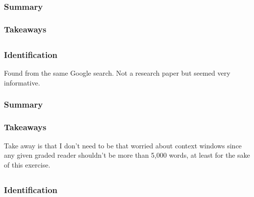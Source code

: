 \documentclass[
	letterpaper, %
]{jdf}
\begin{document}
\subsubsection{Summary}

\subsubsection{Takeaways}

\subsection{}
\subsubsection{Identification}
Found from the same Google search. Not a research paper but seemed very informative.

\subsubsection{Summary}

\subsubsection{Takeaways}
Take away is that I don't need to be that worried about context windows since any given graded reader shouldn't be more than 5,000 words, at least for the sake of this exercise.


\subsection{}
\subsubsection{Identification}
\end{document}
